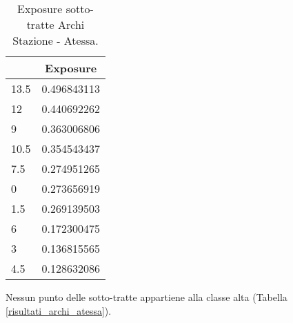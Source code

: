 \begin{table}[H]
	\centering
	\begin{tabular}{|l|l|}
		\hline
		\rowcolor[HTML]{9B9B9B} 
		\multicolumn{1}{|c|}{\cellcolor[HTML]{9B9B9B}\textbf{Km}} & \multicolumn{1}{c|}{\cellcolor[HTML]{9B9B9B}\textbf{Exposure}} \\ \hline
		\rowcolor[HTML]{F8FF00} 
		13.5                                                      & 0.496843113                                                    \\ \hline
		\rowcolor[HTML]{F8FF00} 
		12                                                        & 0.440692262                                                    \\ \hline
		\rowcolor[HTML]{F8FF00} 
		9                                                         & 0.363006806                                                    \\ \hline
		\rowcolor[HTML]{F8FF00} 
		10.5                                                      & 0.354543437                                                    \\ \hline
		\rowcolor[HTML]{F8FF00} 
		7.5                                                       & 0.274951265                                                    \\ \hline
		\rowcolor[HTML]{F8FF00} 
		0                                                         & 0.273656919                                                    \\ \hline
		\rowcolor[HTML]{F8FF00} 
		1.5                                                       & 0.269139503                                                    \\ \hline
		\rowcolor[HTML]{32CB00} 
		6                                                         & 0.172300475                                                    \\ \hline
		\rowcolor[HTML]{32CB00} 
		3                                                         & 0.136815565                                                    \\ \hline
		\rowcolor[HTML]{32CB00} 
		4.5                                                       & 0.128632086                                                    \\ \hline
	\end{tabular}
	\caption{Exposure sotto-tratte Archi Stazione - Atessa.}
	\label{exposure_archi_atessa}
\end{table}
Nessun punto delle sotto-tratte appartiene alla classe alta (Tabella \ref{risultati_archi_atessa}).

